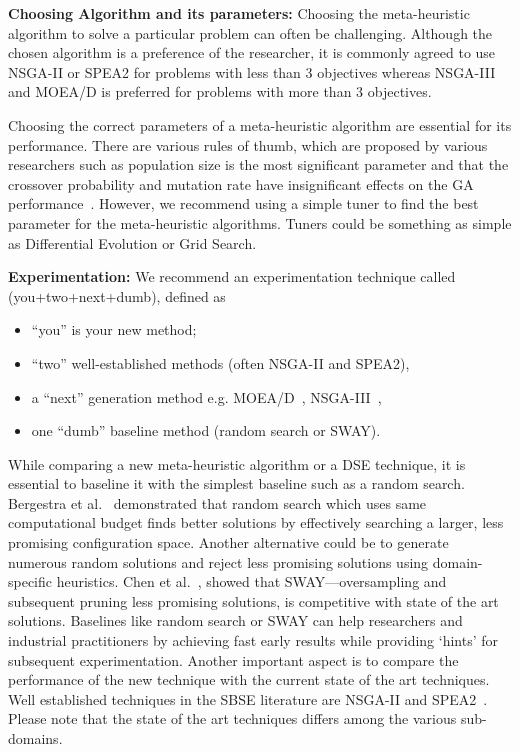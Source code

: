 \documentclass[sigconf]{acmart}
\begin{document}
\noindent\textbf{Choosing Algorithm and its parameters: } {Choosing the meta-heuristic algorithm to solve a particular problem can often be challenging. Although the chosen algorithm is a preference of the researcher, it is commonly agreed to use NSGA-II or SPEA2 for problems with less than 3 objectives whereas NSGA-III and MOEA/D is preferred for problems with more than 3 objectives.}

{Choosing the correct parameters of a meta-heuristic algorithm are essential for its performance. There are various rules of thumb, which are proposed by various researchers such as population size is the most significant parameter and that the crossover probability and mutation rate have insignificant effects on the GA performance~\cite{alajmi2014selecting}. However, we recommend using a simple tuner to find the best parameter for the meta-heuristic algorithms. Tuners could be something as simple as Differential Evolution or Grid Search. }

 \noindent\textbf{Experimentation: } We recommend an experimentation technique called (you+two+next+dumb),  defined as 
\begin{itemize}[leftmargin=*]
\item ``you'' is your new method;
    \item ``two''  well-established methods (often NSGA-II and SPEA2),
    \item a ``next''  generation method e.g. MOEA/D~\cite{zhang2007moea}, NSGA-III~\cite{deb2014evolutionary},
    \item  one ``dumb'' baseline method (random search or SWAY).
\end{itemize}

While comparing a new meta-heuristic algorithm or a DSE technique, it is essential to baseline it with the simplest baseline such as a random search. Bergestra et al.~\cite{bergstra2012random} demonstrated that random search which uses same computational budget finds better solutions by effectively searching a larger, less promising configuration space. Another alternative could be to generate numerous random solutions and reject less promising solutions using domain-specific heuristics. Chen et al.~\cite{chen2017sampling}, showed that SWAY---oversampling and subsequent pruning less promising solutions, is competitive with state of the art solutions. Baselines like random search or SWAY can help researchers and industrial practitioners by achieving fast early results while providing `hints' for subsequent experimentation.
Another important aspect is to compare the performance of the new technique with the current state of the art techniques. Well established techniques in the SBSE literature are NSGA-II and SPEA2~\cite{chen2017beyond}. Please note that the state of the art techniques differs among the various sub-domains.
\end{document}
